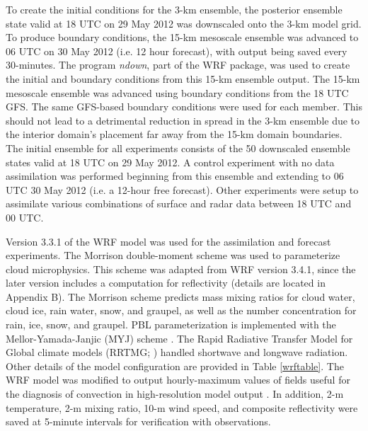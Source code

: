 To create the initial conditions for the 3-km ensemble, the posterior ensemble state valid at 18 UTC on 29 May 2012 was downscaled onto the 3-km model grid. To produce boundary conditions, the 15-km mesoscale ensemble was advanced to 06 UTC on 30 May 2012 (i.e. 12 hour forecast), with output being saved every 30-minutes. The program {\it ndown}, part of the WRF package, was used to create the initial and boundary conditions from this 15-km ensemble output. The 15-km mesoscale ensemble was advanced using boundary conditions from the 18 UTC GFS. The same GFS-based boundary conditions were used for each member. This should not lead to a detrimental reduction in spread in the 3-km ensemble due to the interior domain’s placement far away from the 15-km domain boundaries. The initial ensemble for all experiments consists of the 50 downscaled ensemble states valid at 18 UTC on 29 May 2012. A control experiment with no data assimilation was performed beginning from this ensemble and extending to 06 UTC 30 May 2012 (i.e. a 12-hour free forecast). Other experiments were setup to assimilate various combinations of surface and radar data between 18 UTC and 00 UTC.

Version 3.3.1 of the WRF model was used for the assimilation and forecast experiments. The Morrison double-moment scheme \citep{morrisonetal09} was used to parameterize cloud microphysics. This scheme was adapted from WRF version 3.4.1, since the later version includes a computation for reflectivity (details are located in Appendix B). The Morrison scheme predicts mass mixing ratios for cloud water, cloud ice, rain water, snow, and graupel, as well as the number concentration for rain, ice, snow, and graupel. PBL parameterization is implemented with the Mellor-Yamada-Janjic (MYJ) scheme \citep{janjic94}. The Rapid Radiative Transfer Model for Global climate models (RRTMG; \citealt{iaconoetal08}) handled shortwave and longwave radiation. Other details of the model configuration are provided in Table \ref{wrftable}. The WRF model was modified to output hourly-maximum values of fields useful for the diagnosis of convection in high-resolution model output \citep{kainetal10}. In addition, 2-m temperature, 2-m mixing ratio, 10-m wind speed, and composite reflectivity were saved at 5-minute intervals for verification with observations.

